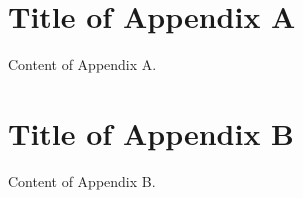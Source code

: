 \chapter{Title of Appendix A}
Content of Appendix A.

\chapter{Title of Appendix B}
Content of Appendix B.